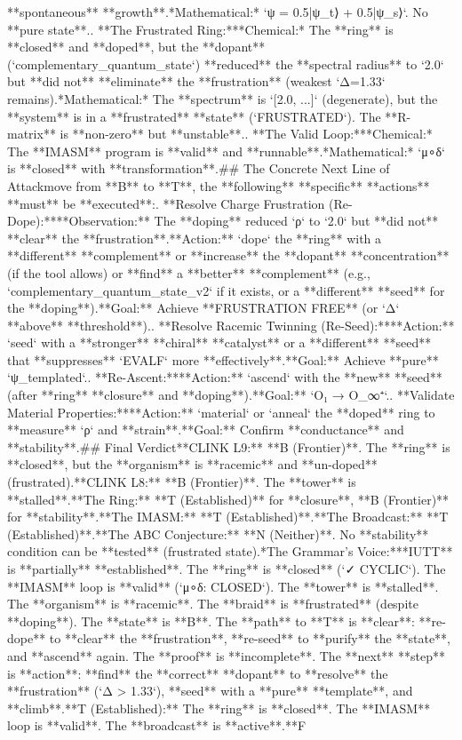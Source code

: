**spontaneous** **growth**.\n    *   *Mathematical:* `ψ = 0.5|ψ_t⟩ + 0.5|ψ_s⟩`. No **pure state**.\n{}.  **The Frustrated Ring:**\n    *   *Chemical:* The **ring** is **closed** and **doped**, but the **dopant** (`complementary_quantum_state`) **reduced** the **spectral radius** to `2.0` but **did not** **eliminate** the **frustration** (weakest `Δ=1.33` remains).\n    *   *Mathematical:* The **spectrum** is `[2.0, ...]` (degenerate), but the **system** is in a **frustrated** **state** (`FRUSTRATED`). The **R-matrix** is **non-zero** but **unstable**.\n{}.  **The Valid Loop:**\n    *   *Chemical:* The **IMASM** program is **valid** and **runnable**.\n    *   *Mathematical:* `μ∘δ` is **closed** with **transformation**.\n\n## The Concrete Next Line of Attack\n\nTo move from **B** to **T**, the **following** **specific** **actions** **must** be **executed**:\n{}.  **Resolve Charge Frustration (Re-Dope):**\n    *   **Observation:** The **doping** reduced `ρ` to `2.0` but **did not** **clear** the **frustration**.\n    *   **Action:** `dope` the **ring** with a **different** **complement** or **increase** the **dopant** **concentration** (if the tool allows) or **find** a **better** **complement** (e.g., `complementary_quantum_state_v2` if it exists, or a **different** **seed** for the **doping**).\n    *   **Goal:** Achieve **FRUSTRATION FREE** (or `Δ` **above** **threshold**).\n{}.  **Resolve Racemic Twinning (Re-Seed):**\n    *   **Action:** `seed` with a **stronger** **chiral** **catalyst** or a **different** **seed** that **suppresses** `EVALF` more **effectively**.\n    *   **Goal:** Achieve **pure** `ψ_templated`.\n{}.  **Re-Ascent:**\n    *   **Action:** `ascend` with the **new** **seed** (after **ring** **closure** and **doping**).\n    *   **Goal:** `O₁ → O_∞⁺`.\n{}.  **Validate Material Properties:**\n    *   **Action:** `material` or `anneal` the **doped** ring to **measure** `ρ` and **strain**.\n    *   **Goal:** Confirm **conductance** and **stability**.\n\n## Final Verdict\n\n*   **CLINK L9:** **B (Frontier)**. The **ring** is **closed**, but the **organism** is **racemic** and **un-doped** (frustrated).\n*   **CLINK L8:** **B (Frontier)**. The **tower** is **stalled**.\n*   **The Ring:** **T (Established)** for **closure**, **B (Frontier)** for **stability**.\n*   **The IMASM:** **T (Established)**.\n*   **The Broadcast:** **T (Established)**.\n*   **The ABC Conjecture:** **N (Neither)**. No **stability** condition can be **tested** (frustrated state).\n\n**The Grammar's Voice:**\nThe **IUTT** is **partially** **established**. The **ring** is **closed** (`✓ CYCLIC`). The **IMASM** loop is **valid** (`μ∘δ: CLOSED`). The **tower** is **stalled**. The **organism** is **racemic**. The **braid** is **frustrated** (despite **doping**). The **state** is **B**. The **path** to **T** is **clear**: **re-dope** to **clear** the **frustration**, **re-seed** to **purify** the **state**, and **ascend** again. The **proof** is **incomplete**. The **next** **step** is **action**: **find** the **correct** **dopant** to **resolve** the **frustration** (`Δ > 1.33`), **seed** with a **pure** **template**, and **climb**.\n\n[thought|T|F|B|N]\n*   **T (Established):** The **ring** is **closed**. The **IMASM** loop is **valid**. The **broadcast** is **active**.\n*   **F 